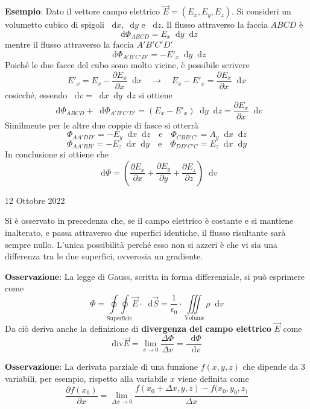 \documentclass[a4paper]{extarticle}
\newcommand\dif{\mathop{}\!\mathrm{d}}
\begin{document}
\vspace{1em}
\noindent
\textbf{Esempio}: Dato il vettore campo elettrico $\vec E=(E_x,E_y,E_z)$. Si consideri un volumetto cubico di spigoli $\dif x, \dif y$ e $\dif z$. Il flusso attraverso la faccia $ABCD$ è
\[\dif \Phi_{ABCD} = E_x \dif y \dif z\]
mentre il flusso attraverso la faccia $A'B'C'D'$ 
\[\dif \Phi_{A'B'C'D'} = -E'_x \dif y \dif z\]
Poiché le due facce del cubo sono molto vicine, è possibile scrivere
\[E'_x=E_x - \frac{\partial E_x}{\partial x} \dif x \hspace{1em} \rightarrow \hspace{1em} E_x-E'_x=\frac{\partial E_x}{\partial x} \dif x\]
cosicché, essendo $\dif v = \dif x \dif y \dif z$ si ottiene
\[\dif \Phi_{ABCD} + \dif \Phi_{A'B'C'D'} = \left(E_x-E'_x\right) \dif y \dif z = \frac{\partial E_x}{\partial x} \dif v\]
Similmente per le altre due coppie di fasce si otterrà
\[\Phi_{AA'DD'} = -E_y \dif x \dif z \hspace{1em} \text{e} \hspace{1em}\Phi_{CBB'C'} = A_y \dif x \dif z\]
\[\Phi_{AA'BB'} = -E_z \dif x \dif y \hspace{1em} \text{e} \hspace{1em}\Phi_{DD'C'C} = E_z \dif x \dif y\]
In conclusione si ottiene che
\[\dif \Phi = \left(\frac{\partial E_x}{\partial x} + \frac{\partial E_y}{\partial y} + \frac{\partial E_z}{\partial z}\right) \dif v\]

\newpage
\noindent
\begin{center}
  12 Ottobre 2022
\end{center}
Si è osservato in precedenza che, se il campo elettrico è costante e si mantiene inalterato, e passa attraverso due superfici identiche, il flusso risultante sarà sempre nullo. L'unica possibilità perché esso non si azzeri è che vi sia una differenza tra le due superfici, ovverosia un gradiente.

\vspace{1em}
\noindent
\textbf{Osservazione}: La legge di Gauss, scritta in forma differenziale, si può esprimere come
\[\boxed{\Phi = \underset{\text{Superficie}}{\oint \oint} \vec E \cdot \dif \vec S = \frac{1}{\epsilon_0} \cdot \underset{\text{Volume}}{\iiint} \rho \dif v}\]
Da ciò deriva anche la definizione di \textbf{divergenza del campo elettrico} $\vec E$ come 
\[\boxed{\text{div} \vec E = \lim_{v \to 0} \frac{\Delta \Phi}{\Delta v} = \frac{\dif \Phi}{\dif v}}\]

\vspace{1em}
\noindent
\textbf{Osservazione}: La derivata parziale di una funzione $f(x,y,z)$ che dipende da $3$ variabili, per esempio, rispetto alla variabile $x$ viene definita come
\[\frac{\partial f(x_0)}{\partial x} = \lim_{\Delta x \to 0} \frac{f(x_0+\Delta x,y,z) - f(x_0,y_0,z_)}{\Delta x}\]
\end{document}
